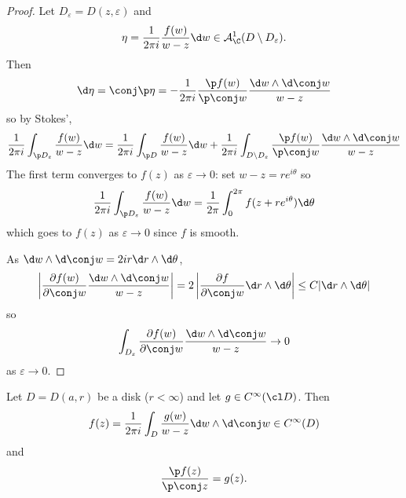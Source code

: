\documentclass[a4paper]{article}
\newcommand{\w}{\wedge} %
\begin{document}
\begin{proof}
  Let \(D_\varepsilon = D(z, \varepsilon)\) and
  \[
    \eta = \frac{1}{2\pi i} \frac{f(w)}{w - z} \d w \in \mathcal A_\C^1 (D \setminus D_\varepsilon).
  \]
  Then
  \[
    \d\eta
    = \conj \p \eta
    = -\frac{1}{2\pi i} \frac{\p f(w)}{\p \conj w} \frac{\d w \w \d \conj w}{w - z}
  \]
  so by Stokes',
  \[
    \frac{1}{2\pi i} \int_{\p D_\varepsilon} \frac{f(w)}{w - z} \d w
    = \frac{1}{2\pi i} \int_{\p D} \frac{f(w)}{w - z} \d w + \frac{1}{2\pi i} \int_{D \setminus D_\varepsilon} \frac{\p f(w)}{\p \conj w} \frac{\d w \w \d \conj w}{w - z}
  \]
  The first term converges to \(f(z)\) as \(\varepsilon \to 0\): set \(w - z = re^{i\theta}\) so
  \[
    \frac{1}{2\pi i} \int_{\p D_\varepsilon} \frac{f(w)}{w - z} \d w
    = \frac{1}{2\pi} \int_0^{2\pi} f(z + re^{i\theta}) \d\theta
  \]
  which goes to \(f(z)\) as \(\varepsilon \to 0\) since \(f\) is smooth.

  As \(\d w \w \d \conj w = 2ir \d r \w \d \theta\),
  \[
    \left| \frac{\partial f(w)}{\partial \conj w}  \frac{\d w \w \d \conj w}{w - z} \right|
    = 2 \left| \frac{\partial f}{\partial \conj w} \d r \w \d\theta \right|
    \leq C |\d r \w \d\theta|
  \]
  so
  \[
    \int_{D_\varepsilon} \frac{\partial f(w)}{\partial \conj w} \frac{\d w \w \d \conj w}{w - z}
    \to 0
  \]
  as \(\varepsilon \to 0\).
\end{proof}

\begin{theorem}
  Let \(D = D(a, r)\) be a disk (\(r < \infty\)) and let \(g \in C^\infty(\cl D)\). Then
  \[
    f(z) = \frac{1}{2\pi i} \int_D \frac{g(w)}{w - z} \d w \w \d \conj w \in C^\infty(D)
  \]
  and
  \[
    \frac{\p f(z)}{\p \conj z} = g(z).
  \]
\end{theorem}
\end{document}
